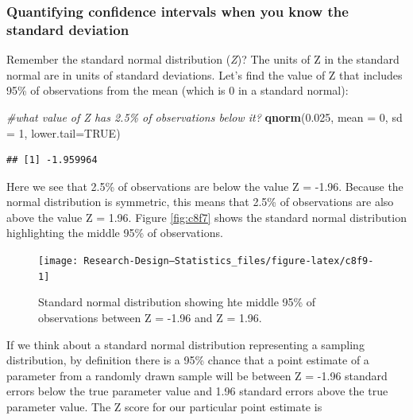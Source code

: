 \documentclass[
]{book}
\newenvironment{Shaded}{\begin{snugshade}}{\end{snugshade}}
\newcommand{\AttributeTok}[1]{\textcolor[rgb]{0.13,0.29,0.53}{#1}}
\newcommand{\CommentTok}[1]{\textcolor[rgb]{0.56,0.35,0.01}{\textit{#1}}}
\newcommand{\ConstantTok}[1]{\textcolor[rgb]{0.56,0.35,0.01}{#1}}
\newcommand{\DecValTok}[1]{\textcolor[rgb]{0.00,0.00,0.81}{#1}}
\newcommand{\FloatTok}[1]{\textcolor[rgb]{0.00,0.00,0.81}{#1}}
\newcommand{\FunctionTok}[1]{\textcolor[rgb]{0.13,0.29,0.53}{\textbf{#1}}}
\newcommand{\NormalTok}[1]{#1}
\begin{document}
\subsubsection{Quantifying confidence intervals when you know the standard deviation}\label{quantifying-confidence-intervals-when-you-know-the-standard-deviation}

Remember the standard normal distribution (\emph{Z})? The units of Z in the standard normal are in units of standard deviations. Let's find the value of Z that includes 95\% of observations from the mean (which is 0 in a standard normal):

\begin{Shaded}
\begin{Highlighting}[]
\CommentTok{\#what value of Z has 2.5\% of observations below it?}
\FunctionTok{qnorm}\NormalTok{(}\FloatTok{0.025}\NormalTok{, }\AttributeTok{mean =} \DecValTok{0}\NormalTok{, }\AttributeTok{sd =} \DecValTok{1}\NormalTok{, }\AttributeTok{lower.tail=}\ConstantTok{TRUE}\NormalTok{)}
\end{Highlighting}
\end{Shaded}

\begin{verbatim}
## [1] -1.959964
\end{verbatim}

Here we see that 2.5\% of observations are below the value Z = -1.96. Because the normal distribution is symmetric, this means that 2.5\% of observations are also above the value Z = 1.96. Figure \ref{fig:c8f7} shows the standard normal distribution highlighting the middle 95\% of observations.

\begin{figure}

{\centering \texttt{[image: Research-Design---Statistics\_files/figure-latex/c8f9-1]} 

}

\caption{Standard normal distribution showing hte middle 95\% of observations between Z = -1.96 and Z = 1.96.}\label{fig:c8f9}
\end{figure}

If we think about a standard normal distribution representing a sampling distribution, by definition there is a 95\% chance that a point estimate of a parameter from a randomly drawn sample will be between Z = -1.96 standard errors below the true parameter value and 1.96 standard errors above the true parameter value. The Z score for our particular point estimate is
\end{document}
